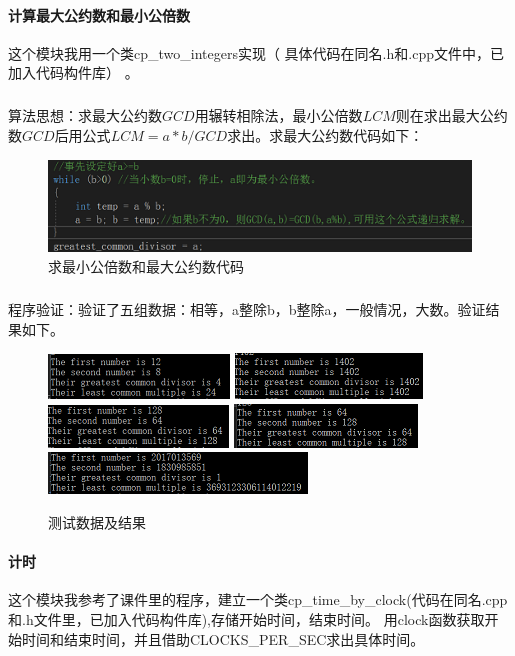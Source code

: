 \documentclass[UTF8]{ctexart}
\begin{document}
    \paragraph{计算最大公约数和最小公倍数}
    这个模块我用一个类cp\_two\_integers实现（ 具体代码在同名.h和.cpp文件中，已加入代码构件库） 。
    \subparagraph{}
    算法思想：求最大公约数$GCD$用辗转相除法，最小公倍数$LCM$则在求出最大公约数$GCD$后用公式$LCM=a*b/GCD$求出。求最大公约数代码如下：
     \begin{figure}[htbp]
    	\centering
    	\includegraphics{a1.png}
    	\caption{求最小公倍数和最大公约数代码}
    \end{figure}
    \subparagraph{}
    程序验证：验证了五组数据：相等，a整除b，b整除a，一般情况，大数。验证结果如下。
    \begin{figure}[htbp]
   	\centering
   	\includegraphics{b1.png}
   	\includegraphics{b2.png}
   	\includegraphics{b3.png}
   	\includegraphics{b4.png}
   	\includegraphics{b5.png}
   	\caption{测试数据及结果}
   \end{figure}
    \paragraph{计时}
    这个模块我参考了课件里的程序，建立一个类cp\_time\_by\_clock(代码在同名.cpp和.h文件里，已加入代码构件库),存储开始时间，结束时间。
    用clock函数获取开始时间和结束时间，并且借助CLOCKS\_PER\_SEC求出具体时间。  
\end{document}
